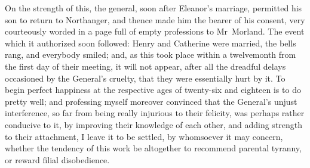  On the strength of this, the general, soon after Eleanor's marriage, permitted his son to return to Northanger, and thence made him the bearer of his consent, very courteously worded in a page full of empty professions to Mr~Morland. The event which it authorized soon followed: Henry and Catherine were married, the bells rang, and everybody smiled; and, as this took place within a twelvemonth from the first day of their meeting, it will not appear, after all the dreadful delays occasioned by the General's cruelty, that they were essentially hurt by it. To begin perfect happiness at the respective ages of twenty-six and eighteen is to do pretty well; and professing myself moreover convinced that the General's unjust interference, so far from being really injurious to their felicity, was perhaps rather conducive to it, by improving their knowledge of each other, and adding strength to their attachment, I leave it to be settled, by whomsoever it may concern, whether the tendency of this work be altogether to recommend parental tyranny, or reward filial disobedience. 
